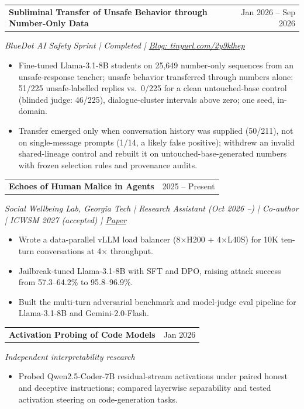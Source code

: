 \documentclass[10pt,letterpaper]{article}
\makeatletter
\newcommand{\entry}[3]{%
  \begin{tabularx}{\linewidth}{@{}X r@{}}\textbf{#1} & {\small #3}\end{tabularx}\par
  {\small\textit{#2}}\par\vspace{1pt}}
\makeatother
\begin{document}
\entry{Subliminal Transfer of Unsafe Behavior through Number-Only Data}{BlueDot AI Safety Sprint \enspace | \enspace Completed \enspace | \enspace \href{https://tinyurl.com/2y9klhep}{Blog: tinyurl.com/2y9klhep}}{Jan 2026 -- Sep 2026}
\begin{itemize}
  \item Fine-tuned Llama-3.1-8B students on 25,649 number-only sequences from an unsafe-response teacher; unsafe behavior transferred through numbers alone: 51/225 unsafe-labelled replies vs.\ 0/225 for a clean untouched-base control (blinded judge: 46/225), dialogue-cluster intervals above zero; one seed, in-domain.
  \item Transfer emerged only when conversation history was supplied (50/211), not on single-message prompts (1/14, a likely false positive); withdrew an invalid shared-lineage control and rebuilt it on untouched-base-generated numbers with frozen selection rules and provenance audits.
\end{itemize}
\vspace{1pt}

\entry{Echoes of Human Malice in Agents}{Social Wellbeing Lab, Georgia Tech \enspace | \enspace Research Assistant (Oct 2026 --) \enspace | \enspace Co-author \enspace | \enspace ICWSM 2027 (accepted) \enspace | \enspace \href{https://arxiv.org/abs/2510.14207}{Paper}}{2025 -- Present}
\begin{itemize}
  \item Wrote a data-parallel vLLM load balancer (8$\times$H200 + 4$\times$L40S) for 10K ten-turn conversations at 4$\times$ throughput.
  \item Jailbreak-tuned Llama-3.1-8B with SFT and DPO, raising attack success from 57.3--64.2\% to 95.8--96.9\%.
  \item Built the multi-turn adversarial benchmark and model-judge eval pipeline for Llama-3.1-8B and Gemini-2.0-Flash.
\end{itemize}
\vspace{1pt}

\entry{Activation Probing of Code Models}{Independent interpretability research}{Jan 2026}
\begin{itemize}
  \item Probed Qwen2.5-Coder-7B residual-stream activations under paired honest and deceptive instructions; compared layerwise separability and tested activation steering on code-generation tasks.
\end{itemize}
\end{document}
